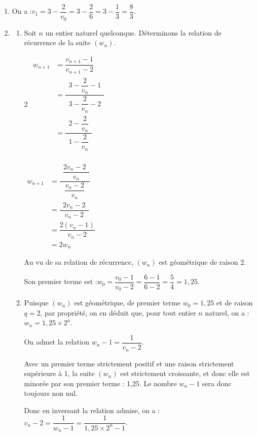 \documentclass[10pt]{article}
\begin{document}
	\begin{enumerate}
		\item On a :\quad $v_1 = 3 - \dfrac{2}{v_0} = 3 - \dfrac{2}{6} = 3 - \dfrac{1}{3} = \dfrac{8}{3}$.

		\item
		\begin{enumerate}
			\item Soit $n$ un entier naturel quelconque. Déterminons la relation de récurrence de la suite $(w_n)$.

			\begin{multicols}{2}
				$\begin{aligned}
				w_{n+1} &= \dfrac{v_{n+1} - 1}{v_{n+1} - 2} \\
				&= \dfrac{~~3 - \dfrac{2}{v_n} - 1~~}{3 - \dfrac{2}{v_n} - 2}\\
				&= \dfrac{~~2 - \dfrac{2}{v_n}~~}{1 - \dfrac{2}{v_n}}\\
			\end{aligned}$

			$\begin{aligned}
				w_{n+1} &= \dfrac{~~\dfrac{2v_n - 2~~}{v_n}}{\dfrac{v_n - 2}{v_n}} \\
				&= \dfrac{~~2v_n - 2~~}{v_n - 2} \\
				&= \dfrac{2(v_n - 1)}{v_n - 2} \\
				&= 2w_n
			\end{aligned}$
			\end{multicols}

			Au vu de sa relation de récurrence, $(w_n)$ est géométrique de raison 2.

			Son premier terme est :\quad $w_0 = \dfrac{v_0 - 1}{v_0 - 2} = \dfrac{6 - 1}{6 - 2} = \dfrac{5}{4} = 1,25$.

			\item Puisque $(w_n)$ est géométrique, de premier terme $w_0 = 1,25 $ et de raison $q = 2$, par propriété, on en déduit que, pour tout entier $n$ naturel, on a : \quad $w_n = 1,25 \times 2^n$.

			On admet la relation \quad $w_n - 1 = \dfrac{1}{v_n - 2}$.

			Avec un premier terme strictement positif et une raison strictement supérieure à 1, la suite $(w_n)$ est strictement croissante, et donc elle est minorée par son premier terme : 1,25. Le nombre $w_n - 1$ sera donc toujours non nul.

			Donc en inversant la relation admise, on a :\quad $v_n - 2 = \dfrac{1}{w_n - 1} = \dfrac{1}{1,25 \times 2^n - 1}$.


\end{enumerate}
\end{enumerate}
\end{document}

